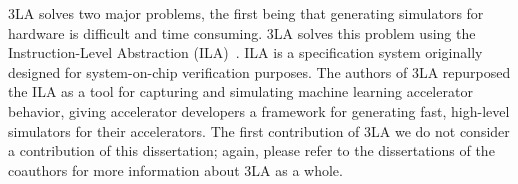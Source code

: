 3LA solves two major problems,
  the first being that
  generating simulators
  for hardware
  is difficult
  and time consuming.
3LA solves this problem
  using the Instruction-Level Abstraction (ILA)~\cite{huang2018instruction,huang2018formal}.
ILA is a specification system
  originally designed for
  system-on-chip verification purposes.
The authors of 3LA
  repurposed the ILA
  as a tool for capturing
  and simulating
  machine learning accelerator behavior,
  giving accelerator developers
  a framework for generating fast,
  high-level simulators
  for their accelerators.
The first contribution
  of 3LA
  we do not consider
  a contribution of this dissertation;
  again, please refer to the dissertations
  of the coauthors
  for more information about 3LA as a whole.

